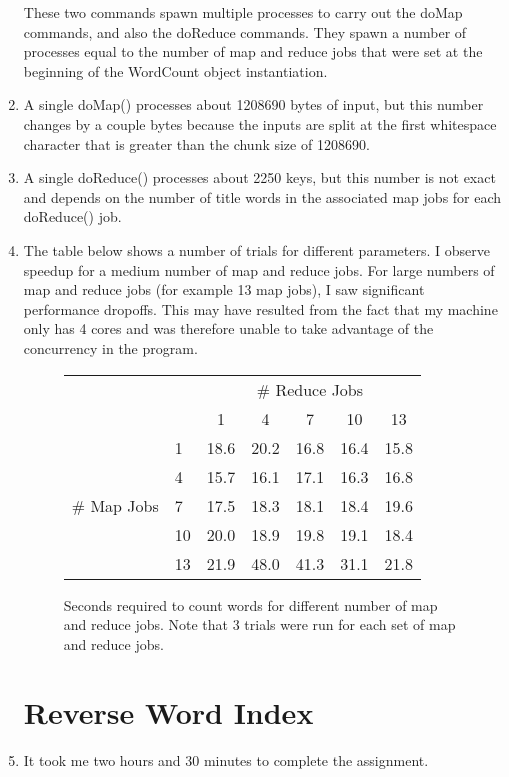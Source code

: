 \documentclass[psamsfonts]{amsart}
\begin{document}
\begin{enumerate}
  These two commands spawn multiple processes to carry out the doMap commands, and also the doReduce commands. They spawn a number of processes equal to the number of map and reduce jobs that were set at the beginning of the WordCount object instantiation.
  \item A single doMap() processes about 1208690 bytes of input, but this number changes by a couple bytes because the inputs are split at the first whitespace character that is greater than the chunk size of 1208690.
  \item A single doReduce() processes about 2250 keys, but this number is not exact and depends on the number of title words in the associated map jobs for each doReduce() job.
  \item The table below shows a number of trials for different parameters. I observe speedup for a medium number of map and reduce jobs. For large numbers of map and reduce jobs (for example 13 map jobs), I saw significant performance dropoffs. This may have resulted from the fact that my machine only has 4 cores and was therefore unable to take advantage of the concurrency in the program.

    \begin{figure}
    \begin{tabular}{l l | c  c  c  c  c}
      &  & \multicolumn{5}{c}{\# Reduce Jobs} \\
      & & 1& 4 & 7 & 10 & 13 \\
      \cline{2-7}
    \multirow{5}{*}{\# Map Jobs}      &  1 & 18.6 & 20.2 & 16.8 & 16.4 & 15.8 \\
                                      &  4 & 15.7 & 16.1 & 17.1 & 16.3 & 16.8 \\
                                      &  7 & 17.5 & 18.3 & 18.1 & 18.4 & 19.6 \\
                                      & 10 & 20.0 & 18.9 & 19.8 & 19.1 & 18.4 \\
                                      & 13 & 21.9 & 48.0 & 41.3 & 31.1 & 21.8
    \end{tabular}
    \caption{Seconds required to count words for different number of map and reduce jobs. Note that 3 trials were run for each set of map and reduce jobs.}
    \end{figure}

    \section{Reverse Word Index}
  \item It took me two hours and 30 minutes to complete the assignment.


\end{enumerate}
\end{document}
